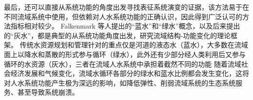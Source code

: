 最后，还可以直接从系统功能的角度出发寻找表征系统演变的证据，该方法易于在不同流域系统中使用，但依赖对人水系统功能的正确认识，因此得到广泛认可的方法指标相对较少。
Falkenmark 等人提出的“蓝水”和“绿水”概念\cite{falkenmark2006}，以及后来提出的“灰水”，都是典型的从系统功能角度出发，研究流域结构-功能变化的理论框架。 %
传统水资源规划和管理针对的重点仅是河道的液态水（蓝水），大多数在流域面上以降水和蒸散的形式参与循环（绿水），此外还有少部分经人类利用后又参与循环的水资源（灰水），三者在流域人水系统中承担着截然不同的功能\cite{craswell2007}
随着流域社会经济发展和气候变化，流域水循环各部分的绿水和蓝水比例都会发生变化，这将对人水系统功能产生极为深远的影响，如降低弹性、削弱流域系统的生态系统服务、甚至导致系统崩溃\cite{falkenmark2019}。
